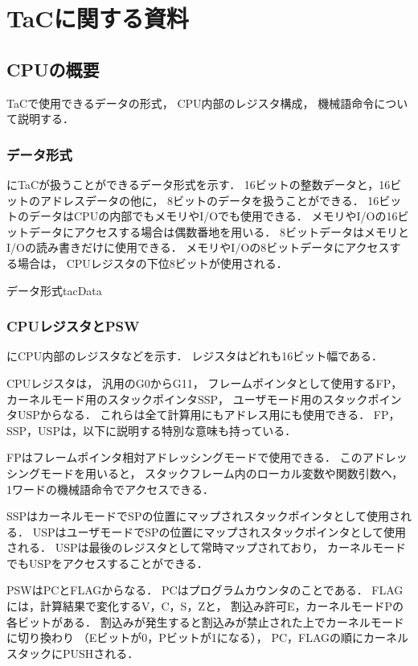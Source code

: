 \chapter{TaCに関する資料}
\label{appTac}

\section{CPUの概要}
TaCで使用できるデータの形式，
CPU内部のレジスタ構成，
機械語命令について説明する．

\subsection{データ形式}
にTaCが扱うことができるデータ形式を示す．
16ビットの整数データと，16ビットのアドレスデータの他に，
8ビットのデータを扱うことができる．
16ビットのデータはCPUの内部でもメモリやI/Oでも使用できる．
メモリやI/Oの16ビットデータにアクセスする場合は偶数番地を用いる．
8ビットデータはメモリとI/Oの読み書きだけに使用できる．
メモリやI/Oの8ビットデータにアクセスする場合は，
CPUレジスタの下位8ビットが使用される．

{データ形式}{tacData}

\subsection{CPUレジスタとPSW}
にCPU内部のレジスタなどを示す．
レジスタはどれも16ビット幅である．

CPUレジスタは，
汎用のG0からG11，
フレームポインタとして使用するFP，
カーネルモード用のスタックポインタSSP，
ユーザモード用のスタックポインタUSPからなる．
これらは全て計算用にもアドレス用にも使用できる．
FP，SSP，USPは，以下に説明する特別な意味も持っている．

FPはフレームポインタ相対アドレッシングモードで使用できる．
このアドレッシングモードを用いると，
スタックフレーム内のローカル変数や関数引数へ，
1ワードの機械語命令でアクセスできる．

SSPはカーネルモードでSPの位置にマップされスタックポインタとして使用される．
USPはユーザモードでSPの位置にマップされスタックポインタとして使用される．
USPは最後のレジスタとして常時マップされており，
カーネルモードでもUSPをアクセスすることができる．

PSWはPCとFLAGからなる．
PCはプログラムカウンタのことである．
FLAGには，計算結果で変化するV，C，S，Zと，
割込み許可E，カーネルモードPの各ビットがある．
割込みが発生すると割込みが禁止された上でカーネルモードに切り換わり
（Eビットが0，Pビットが1になる），
PC，FLAGの順にカーネルスタックにPUSHされる．


